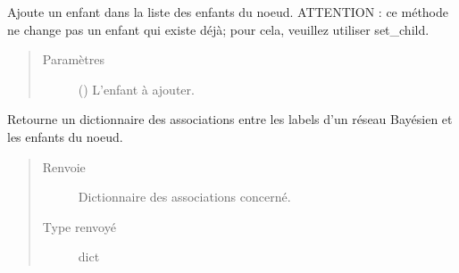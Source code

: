 \documentclass[letterpaper,10pt,french]{sphinxmanual}
\begin{document}
\begin{fulllineitems}
\begin{fulllineitems}
\begin{quote}
\begin{description}
\end{description}\end{quote}

\end{fulllineitems}


\begin{fulllineitems}
\label{\detokenize{index:StrategyTree.Repair.add_child}}
Ajoute un enfant dans la liste des enfants du noeud.
ATTENTION : ce méthode ne change pas un enfant qui existe déjà; pour
cela, veuillez utiliser set\_child.
\begin{quote}\begin{description}
\item[{Paramètres}] \leavevmode
{} ({\hyperref[\detokenize{index:StrategyTree.NodeST}]{}}) \textendash{} L’enfant à ajouter.

\end{description}\end{quote}

\end{fulllineitems}


\begin{fulllineitems}
\label{\detokenize{index:StrategyTree.Repair.bn_labels_children_association}}
Retourne un dictionnaire des associations entre les labels d’un réseau
Bayésien et les enfants du noeud.
\begin{quote}\begin{description}
\item[{Renvoie}] \leavevmode
{} \textendash{} Dictionnaire des associations concerné.

\item[{Type renvoyé}] \leavevmode
dict

\end{description}\end{quote}

\end{fulllineitems}


\end{fulllineitems}
\end{document}
